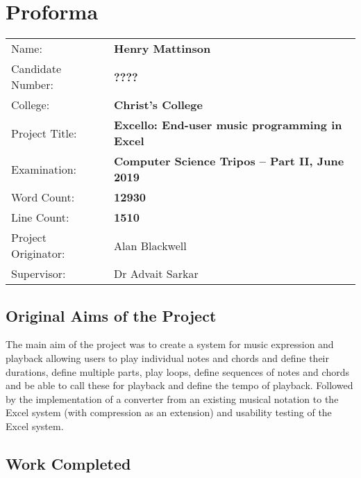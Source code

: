 \chapter*{Proforma}

{\large
\begin{tabular}{ll}
Name:               & \bf Henry Mattinson                      \\
Candidate Number:   & \bf ????                                \\
College:            & \bf Christ's College                     \\
Project Title:      & \bf Excello: End-user music programming in Excel \\
Examination:        & \bf Computer Science Tripos -- Part II, June 2019  \\
Word Count:         & \bf 12930\footnotemark[1]  \\
Line Count:         & \bf 1510\footnotemark[2]  \\
Project Originator: & Alan Blackwell                    \\
Supervisor:         & Dr Advait Sarkar                    \\
\end{tabular}
}


\section*{Original Aims of the Project}

The main aim of the project was to create a system for music expression and playback allowing users to play individual notes and chords and define their durations, define multiple parts, play loops, define sequences of notes and chords and be able to call these for playback and define the tempo of playback. Followed by the implementation of a converter from an existing musical notation to the Excel system (with compression as an extension) and usability testing of the Excel system.

\section*{Work Completed}

